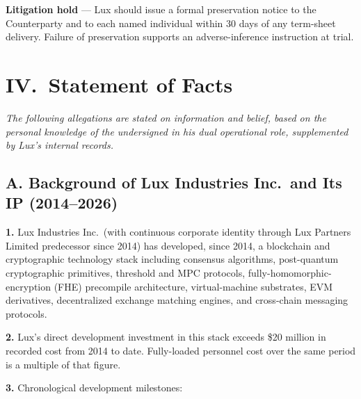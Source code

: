 \documentclass[11pt,letterpaper]{article}
\begin{document}
\textbf{Litigation hold} --- Lux should issue a formal preservation
notice to the Counterparty and to each named individual within 30
days of any term-sheet delivery. Failure of preservation supports an
adverse-inference instruction at trial.

\section*{IV.\ Statement of Facts}

\textit{The following allegations are stated on information and
belief, based on the personal knowledge of the undersigned in his
dual operational role, supplemented by Lux's internal records.}

\subsection*{A. Background of Lux Industries Inc.\ and Its IP (2014--2026)}

\textbf{1.} Lux Industries Inc.\ (with continuous corporate identity
through Lux Partners Limited predecessor since 2014) has developed,
since 2014, a blockchain and cryptographic technology stack including
consensus algorithms, post-quantum cryptographic primitives, threshold
and MPC protocols, fully-homomorphic-encryption (FHE) precompile
architecture, virtual-machine substrates, EVM derivatives, decentralized
exchange matching engines, and cross-chain messaging protocols.

\textbf{2.} Lux's direct development investment in this stack exceeds
\$20 million in recorded cost from 2014 to date. Fully-loaded
personnel cost over the same period is a multiple of that figure.

\textbf{3.} Chronological development milestones:
\end{document}
